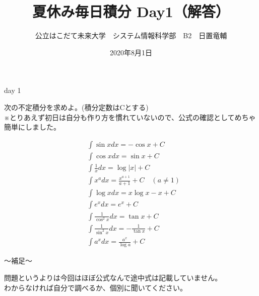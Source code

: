 \documentclass[dvipdfmx,uplatex]{jsarticle}
\title{夏休み毎日積分 Day1（解答）}
\author{公立はこだて未来大学　システム情報科学部　B2　日置竜輔}
\date{2020年8月1日}
\begin{document}
\maketitle
\begin{itembox}[c]{day 1 }
    \begin{center}
        次の不定積分を求めよ。\quad (積分定数はCとする)\\
        ※とりあえず初日は自分も作り方を慣れていないので、公式の確認としてめちゃ簡単にしました。
    \end{center}
\end{itembox}
\begin{align*}
    &\int \sin x dx = -\cos x + C \\
    &\int \cos x dx = \sin x + C \\
    &\int \frac{1}{x} dx = \log |x| + C \\
    &\int x ^ a dx = \frac{x ^ {a + 1}}{a + 1} + C \quad (a \neq 1) \\
    &\int \log x dx = x \log x - x + C \\
    &\int e ^ x dx = e ^ x + C \\
    &\int \frac{1}{\cos ^ 2 x} dx = \tan x + C　\\
    &\int \frac{1}{\sin ^ 2 x} dx = -\frac{1}{\tan x} + C \\
    &\int a ^ x dx = \frac{a ^ x}{\log a} + C
\end{align*}
\begin{boxnote}
    〜補足〜
    \begin{center}
        問題というよりは今回はほぼ公式なんで途中式は記載していません。 \\
        わからなければ自分で調べるか、個別に聞いてください。
    \end{center}
\end{boxnote}
\end{document}
